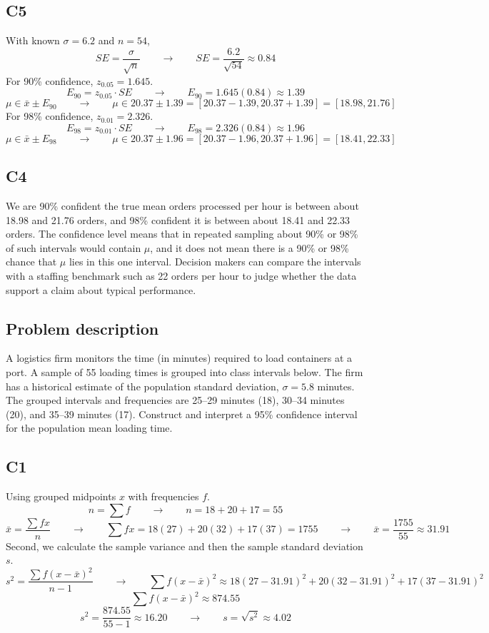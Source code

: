 \begin{ExamProblems}
		\subsection*{C5}
		With known $\sigma = 6.2$ and $n=54$,
		\[
		SE = \frac{\sigma}{\sqrt{n}} \qquad \longrightarrow \qquad SE = \frac{6.2}{\sqrt{54}} \approx 0.84
		\]
		For 90\% confidence, $z_{0.05}=1.645$.
		\[
		E_{90} = z_{0.05} \cdot SE \qquad \longrightarrow \qquad E_{90} = 1.645(0.84) \approx 1.39
		\]
		\[
		\mu \in \bar{x} \pm E_{90} \qquad \longrightarrow \qquad \mu \in 20.37 \pm 1.39 = [20.37 - 1.39, 20.37 + 1.39] = [18.98, 21.76]
		\]
		For 98\% confidence, $z_{0.01}=2.326$.
		\[
		E_{98} = z_{0.01} \cdot SE \qquad \longrightarrow \qquad E_{98} = 2.326(0.84) \approx 1.96
		\]
		\[
		\mu \in \bar{x} \pm E_{98} \qquad \longrightarrow \qquad \mu \in 20.37 \pm 1.96 = [20.37 - 1.96, 20.37 + 1.96] = [18.41, 22.33]
		\]

		\subsection*{C4}
		We are 90\% confident the true mean orders processed per hour is between about 18.98 and 21.76 orders, and 98\% confident it is between about 18.41 and 22.33 orders. The confidence level means that in repeated sampling about 90\% or 98\% of such intervals would contain $\mu$, and it does not mean there is a 90\% or 98\% chance that $\mu$ lies in this one interval. Decision makers can compare the intervals with a staffing benchmark such as 22 orders per hour to judge whether the data support a claim about typical performance.

		\item
		\subsection*{Problem description}
		A logistics firm monitors the time (in minutes) required to load containers at a port.
		A sample of 55 loading times is grouped into class intervals below. The firm has a historical estimate of the population standard deviation, \(\sigma = 5.8\) minutes.
		The grouped intervals and frequencies are 25--29 minutes (18), 30--34 minutes (20), and 35--39 minutes (17).
		Construct and interpret a 95\% confidence interval for the population mean loading time.

		\subsection*{C1}
		Using grouped midpoints $x$ with frequencies $f$.
		\[
		n = \sum f \qquad \longrightarrow \qquad n = 18 + 20 + 17 = 55
		\]
		\[
		\bar{x} = \frac{\sum f x}{n} \qquad \longrightarrow \qquad \sum f x = 18(27) + 20(32) + 17(37) = 1755 \qquad \longrightarrow \qquad \bar{x} = \frac{1755}{55} \approx 31.91
		\]
		Second, we calculate the sample variance and then the sample standard deviation $s$.
		\[
		s^2 = \frac{\sum f(x-\bar{x})^2}{n-1} \qquad \longrightarrow \qquad \sum f(x-\bar{x})^2 \approx 18(27-31.91)^2 + 20(32-31.91)^2 + 17(37-31.91)^2
		\]
		\[
		\sum f(x-\bar{x})^2 \approx 874.55
		\]
		\[
		s^2 = \frac{874.55}{55-1} \approx 16.20  \qquad \longrightarrow \qquad s = \sqrt{s^2} \approx 4.02
		\]

\end{ExamProblems}
